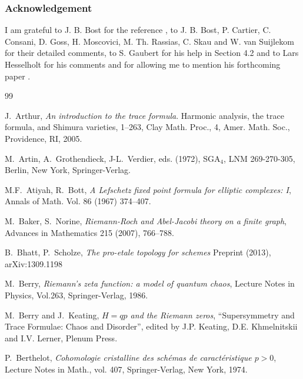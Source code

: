 \documentclass[12pt]{article}
\begin{document}
\subsubsection*{Acknowledgement} I am grateful to J. B. Bost for  the reference \cite{Tatebbk}, to J. B. Bost, P. Cartier, C. Consani, D. Goss, H. Moscovici, M. Th. Rassias, C. Skau and W. van Suijlekom for their detailed comments, to S. Gaubert for his help in Section 4.2 and to Lars Hesselholt for his comments and for allowing me to mention his forthcoming paper \cite{Hessel1}.







\begin{thebibliography}{99}





 J.~Arthur, {\em An introduction to the trace formula}. Harmonic analysis, the trace formula, and Shimura varieties, 1--263, 
Clay Math. Proc., 4, Amer. Math. Soc., Providence, RI, 2005. 



 M.~Artin, A.~Grothendieck, J-L.~Verdier, eds. (1972), SGA$_4$,  LNM 269-270-305, Berlin, New York, Springer-Verlag.






 M.F.~Atiyah, R.~Bott, {\em A Lefschetz fixed point
formula for elliptic complexes: I}, Annals of Math. Vol. 86 (1967)
374--407.



 M.~Baker, S.~Norine, {\em Riemann-Roch and Abel-Jacobi theory on a finite graph},  Advances in Mathematics 215 (2007), 766--788.

 B.~Bhatt, P.~Scholze, {\em The pro-etale topology for schemes} Preprint (2013), arXiv:1309.1198


 M.~Berry, {\em Riemann's zeta function: a model of
quantum chaos}, Lecture Notes in Physics, Vol.263, Springer-Verlag,
1986.

 M.~Berry and J.~Keating, {\em $H=qp$ and the Riemann zeros},
``Supersymmetry and Trace Formulae: Chaos and Disorder'', edited by
J.P. Keating, D.E. Khmelnitskii and I.V. Lerner, Plenum Press.

  P.~Berthelot, {\em Cohomologie cristalline des sch\' emas de caract\' eristique $p>0$}, Lecture Notes in Math., vol. 407, Springer-Verlag, New York, 1974.


\end{thebibliography}
\end{document}
